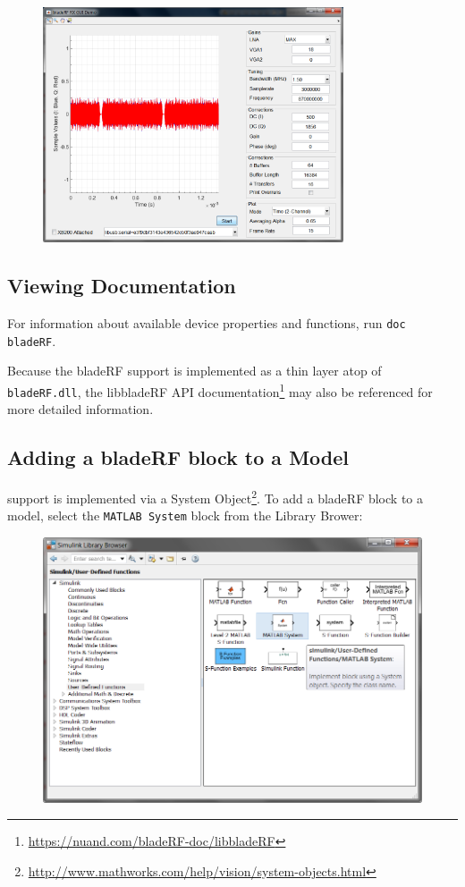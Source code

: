 {\begin{figure}[h]
  \centering
  \includegraphics[width=3.5in]{images/windows/matlab/rxgui-time.png}
\end{figure}

\newpage
\subsection{Viewing Documentation}
For information about available device properties and functions, run \texttt{doc bladeRF}.

Because the bladeRF \matlab support is implemented as a thin layer atop of \texttt{bladeRF.dll}, the
libbladeRF API documentation\footnote{\url{https://nuand.com/bladeRF-doc/libbladeRF}} may also
be referenced for more detailed information.

\newpage
\subsection{Adding a bladeRF block to a \simulink Model}

\simulink support is implemented via a System Object\footnote{\url{http://www.mathworks.com/help/vision/system-objects.html}}.
To add a bladeRF block to a model, select the \texttt{MATLAB System} block from the Library Brower:

\begin{figure}[h]
  \centering
  \includegraphics[width=6in]{images/windows/simulink/browser.png}
\end{figure}

}
